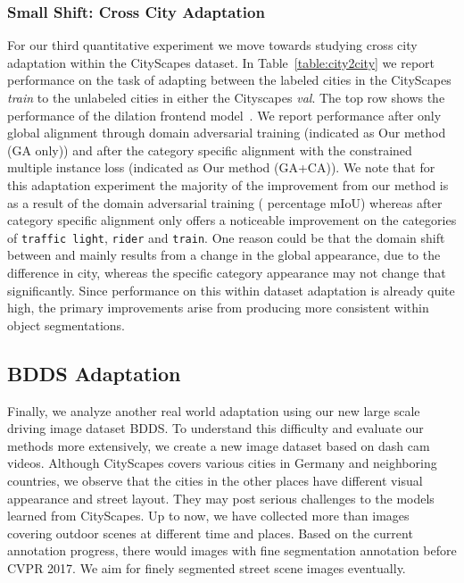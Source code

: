 \documentclass[10pt,twocolumn,letterpaper]{article}
\begin{document}
\subsubsection{Small Shift: Cross City Adaptation}
For our third quantitative experiment we move towards studying cross city adaptation within the CityScapes dataset. 
In Table~\ref{table:city2city} we report performance on the task of adapting between the labeled cities in the CityScapes \textit{train} to the unlabeled cities in either the Cityscapes \textit{val}. The top row shows the performance of the dilation frontend model~\cite{yu2016multi}.
We report performance after only global alignment through domain adversarial training (indicated as Our method (GA only)) and after the category specific alignment with the constrained multiple instance loss (indicated as Our method (GA+CA)). 
We note that for this adaptation experiment the majority of the improvement from our method is as a result of the domain adversarial training ( percentage mIoU) whereas after category specific alignment only offers a noticeable improvement on the categories of \texttt{traffic light}, \texttt{rider} and \texttt{train}. 
One reason could be that the domain shift between  and  mainly results from a change in the global appearance, due to the difference in city, whereas the specific category appearance may not change that significantly. 
Since performance on this within dataset adaptation is already quite high, the primary improvements arise from producing more consistent within object segmentations.

\subsection{BDDS Adaptation}
Finally, we analyze another real world  adaptation using our new large scale driving image dataset BDDS.
To understand this difficulty and evaluate our methods more extensively, we create a new image dataset based on dash cam videos. Although CityScapes covers various cities in Germany and neighboring countries, we observe that the cities in the other places have different visual appearance and street layout. They may post serious challenges to the models learned from CityScapes.
Up to now, we have collected more than  images covering outdoor scenes at different time and places. Based on the current annotation progress, there would  images with fine segmentation annotation before CVPR 2017. We aim for  finely segmented street scene images eventually. 
\end{document}
